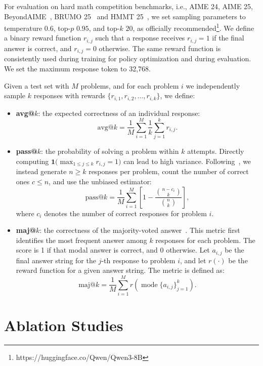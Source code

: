 For evaluation on hard math competition benchmarks, i.e., AIME 24, AIME 25, BeyondAIME~\cite{seed1.5}, BRUMO 25~\cite{matharena} and HMMT 25~\cite{matharena}, we set sampling parameters to temperature $0.6$, top-$p$ $0.95$, and top-$k$ $20$, as officially recommended\footnote{https://huggingface.co/Qwen/Qwen3-8B}.
We define a binary reward function $r_{i,j}$ such that a response receives $r_{i,j}=1$ if the final answer is correct, and $r_{i,j}=0$ otherwise.
The same reward function is consistently used during training for policy optimization and during evaluation. We set the maximum response token to 32,768.

Given a test set with $M$ problems, and for each problem $i$ we independently sample $k$ responses with rewards $\{ r_{i,1}, r_{i,2}, \ldots, r_{i,k} \}$, we define:

\begin{itemize}
    \item \textbf{avg@}$k$: the expected correctness of an individual response:
    \[
        \text{avg@}k = \frac{1}{M} \sum_{i=1}^{M} \frac{1}{k} \sum_{j=1}^{k} r_{i,j}.
    \]
    \item \textbf{pass@}$k$: the probability of solving a problem within $k$ attempts. 
    Directly computing $\mathbf{1}\!\bigl(\max_{1 \leq j \leq k} r_{i,j}=1\bigr)$ can lead to high variance.
    Following~\cite{chen2021evaluating}, we instead generate $n \geq k$ responses per problem, count the number of correct ones $c \leq n$, and use the unbiased estimator:
    \[
        \text{pass@}k = \frac{1}{M} \sum_{i=1}^{M} \left[ 1 - \frac{\binom{n-c_i}{k}}{\binom{n}{k}} \right],
    \]
    where $c_i$ denotes the number of correct responses for problem $i$.
    \item \textbf{maj@}$k$: the correctness of the majority-voted answer~\cite{maj}. This metric first identifies the most frequent answer among $k$ responses for each problem. The score is 1 if that modal answer is correct, and 0 otherwise. Let $a_{i,j}$ be the final answer string for the $j$-th response to problem $i$, and let $r(\cdot)$ be the reward function for a given answer string. The metric is defined as:
    \[
        \text{maj@}k = \frac{1}{M} \sum_{i=1}^{M} r\left(\operatorname{mode}\{a_{i,j}\}_{j=1}^k\right).
    \]
\end{itemize}

\section{Ablation Studies}
\label{appendix:ablation}


